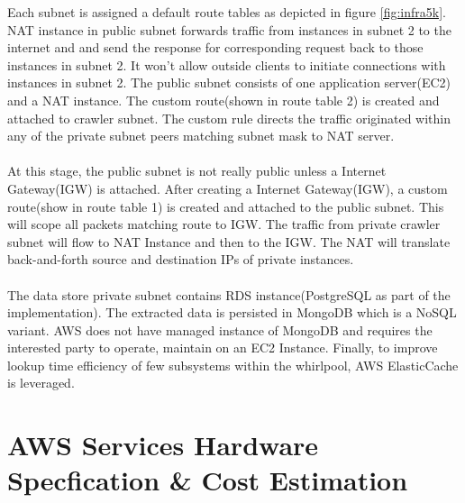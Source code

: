 \noindent
Each subnet is assigned a default route tables as depicted in figure \ref{fig:infra5k}. NAT instance in public subnet forwards traffic from instances in subnet 2 to the internet and and send the response for corresponding request back to those instances in subnet 2. It won't allow outside clients to initiate connections with instances in subnet 2. The public subnet consists of one application server(EC2) and a NAT instance. The custom route(shown in route table 2)  is created and attached to crawler subnet. The custom rule directs the traffic originated within any of the private subnet peers matching subnet mask  to NAT server.
\\
\\
At this stage, the public subnet is not really public unless a Internet Gateway(IGW) is attached. After creating a Internet Gateway(IGW), a custom route(show in route table 1) is created and attached to the public subnet. This will scope all packets matching  route to IGW. The traffic from private
crawler subnet will flow to NAT Instance and then to the IGW. The NAT will translate back-and-forth source
and destination IPs of private instances.
\\
\\
The data store private subnet contains RDS instance(PostgreSQL as part of the implementation). The
extracted data is persisted in MongoDB which is a NoSQL variant. AWS does not have managed instance of
MongoDB and requires the interested party to operate, maintain on an EC2 Instance. Finally, to improve
lookup time efficiency of few subsystems within the whirlpool, AWS ElasticCache is leveraged. 

\section{AWS Services Hardware Specfication \& Cost Estimation}

